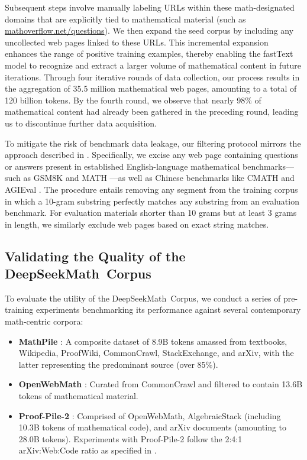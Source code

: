 Subsequent steps involve manually labeling URLs within these math-designated domains that are explicitly tied to mathematical material (such as \url{mathoverflow.net/questions}). We then expand the seed corpus by including any uncollected web pages linked to these URLs. This incremental expansion enhances the range of positive training examples, thereby enabling the fastText model to recognize and extract a larger volume of mathematical content in future iterations. Through four iterative rounds of data collection, our process results in the aggregation of 35.5 million mathematical web pages, amounting to a total of 120 billion tokens. By the fourth round, we observe that nearly 98\% of mathematical content had already been gathered in the preceding round, leading us to discontinue further data acquisition.

To mitigate the risk of benchmark data leakage, our filtering protocol mirrors the approach described in \cite{deepseek-coder}. Specifically, we excise any web page containing questions or answers present in established English-language mathematical benchmarks—such as GSM8K \citep{gsm8k} and MATH \citep{MATH}—as well as Chinese benchmarks like CMATH \citep{wei2023cmath} and AGIEval \citep{agieval}. The procedure entails removing any segment from the training corpus in which a 10-gram substring perfectly matches any substring from an evaluation benchmark. For evaluation materials shorter than 10 grams but at least 3 grams in length, we similarly exclude web pages based on exact string matches.

\subsection{Validating the Quality of the DeepSeekMath~Corpus}

To evaluate the utility of the DeepSeekMath~Corpus, we conduct a series of pre-training experiments benchmarking its performance against several contemporary math-centric corpora:

\begin{itemize}[topsep=0pt]
    \item \textbf{MathPile} \citep{mathpile}: A composite dataset of 8.9B tokens amassed from textbooks, Wikipedia, ProofWiki, CommonCrawl, StackExchange, and arXiv, with the latter representing the predominant source (over 85\%).
    \item \textbf{OpenWebMath} \citep{openwebmath}: Curated from CommonCrawl and filtered to contain 13.6B tokens of mathematical material.
    \item \textbf{Proof-Pile-2} \citep{llemma}: Comprised of OpenWebMath, AlgebraicStack (including 10.3B tokens of mathematical code), and arXiv documents (amounting to 28.0B tokens). Experiments with Proof-Pile-2 follow the 2:4:1 arXiv:Web:Code ratio as specified in \cite{llemma}.
\end{itemize}

